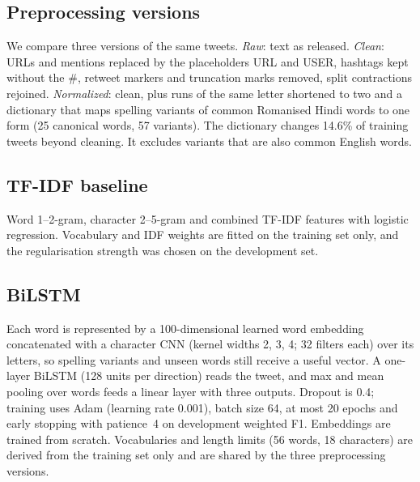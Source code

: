 \documentclass{nle}
\begin{document}
\subsection{Preprocessing versions}
We compare three versions of the same tweets. \emph{Raw}: text as released. \emph{Clean}: URLs and mentions replaced by
the placeholders URL and USER, hashtags kept without the \#, retweet markers and truncation marks removed, split
contractions rejoined. \emph{Normalized}: clean, plus runs of the same letter shortened to two and a dictionary that maps
spelling variants of common Romanised Hindi words to one form (25 canonical words, 57 variants). The dictionary changes
14.6\% of training tweets beyond cleaning. It excludes variants that are also common English words.

\subsection{TF-IDF baseline}
Word 1--2-gram, character 2--5-gram and combined TF-IDF features with logistic regression. Vocabulary and IDF weights are
fitted on the training set only, and the regularisation strength was chosen on the development set.

\subsection{BiLSTM}
Each word is represented by a 100-dimensional learned word embedding concatenated with a character CNN (kernel widths
2, 3, 4; 32 filters each) over its letters, so spelling variants and unseen words still receive a useful vector. A one-layer
BiLSTM (128 units per direction) reads the tweet, and max and mean pooling over words feeds a linear layer with three outputs.
Dropout is 0.4; training uses Adam (learning rate 0.001), batch size 64, at most 20 epochs and early stopping with patience~4
on development weighted F1. Embeddings are trained from scratch. Vocabularies and length limits (56 words, 18 characters) are
derived from the training set only and are shared by the three preprocessing versions.
\end{document}
